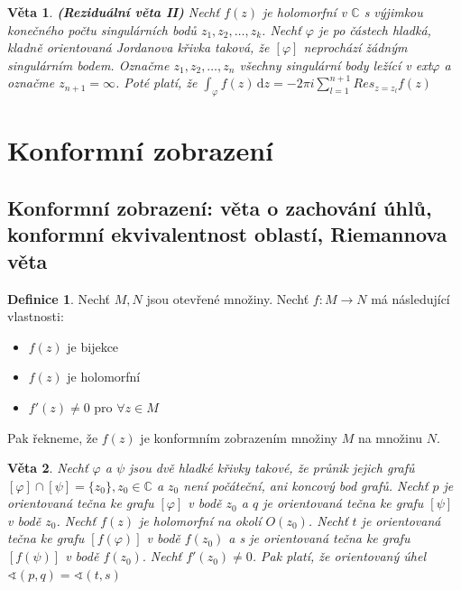 \documentclass[a4]{report}
\newcommand{\fce}{\text{funkce }}
\newcommand{\dd}{\mathrm{d}}
\newcommand{\fz}{$f(z)$ }
\newcommand{\CC}{\mathbb{C}}
\newtheorem{theorem}{Věta}
\theoremstyle{definition}
\newtheorem{definition}{Definice}[section]
\begin{document}
\begin{theorem}
\textbf{(Reziduální věta II)}
Nechť \fce \fz je holomorfní v $\CC$ s výjimkou konečného počtu singulárních bodů $z_1,z_2,\ldots, z_k$. Nechť $\varphi$ je po částech hladká, kladně orientovaná Jordanova křivka taková, že $[\varphi]$ neprochází žádným singulárním bodem. Označme $z_1,z_2,\ldots, z_n$ všechny singulární body ležící v ext$\varphi$ a označme $z_{n+1}=\infty$. Poté platí, že $\int_{\varphi} f(z) \, \dd z = -2\pi i \sum_{l=1}^{n+1}Res_{z=z_l} f(z)$
\end{theorem}




\section{Konformní zobrazení}
\subsection{Konformní zobrazení: věta o zachování úhlů, konformní ekvivalentnost oblastí, Riemannova věta}
\begin{definition}
	Nechť $M,N$ jsou otevřené množiny. Nechť $f:M\rightarrow N$ má následující vlastnosti:
	\begin{itemize}
		\item \fz je bijekce
		\item \fz je holomorfní
		\item $f'(z)\neq 0$ pro $\forall z \in M$
	\end{itemize}
\end{definition} 
Pak řekneme, že \fz je konformním zobrazením množiny $M$ na množinu $N$.

\begin{theorem}
	Nechť $\varphi$ a $\psi$ jsou dvě hladké křivky takové, že průnik jejich grafů $[\varphi] \cap [\psi]=\{z_0\}, z_0\in \CC $ a $z_0$ není počáteční, ani koncový bod grafů.
	Nechť $p$ je orientovaná tečna ke grafu $[\varphi]$ v bodě $z_0$ a $q$ je orientovaná tečna ke grafu $[\psi]$ v bodě $z_0$. Nechť \fz je holomorfní na okolí $O(z_0)$. Nechť $t$ je orientovaná tečna ke grafu $[f(\varphi)]$ v bodě $f(z_0)$ a s je orientovaná tečna ke grafu $[f(\psi)]$ v bodě $f(z_0).$ Nechť $f'(z_0) \neq 0$. Pak platí, že orientovaný úhel $\sphericalangle (p,q)=\sphericalangle (t,s)$   
\end{theorem}
\end{document}
